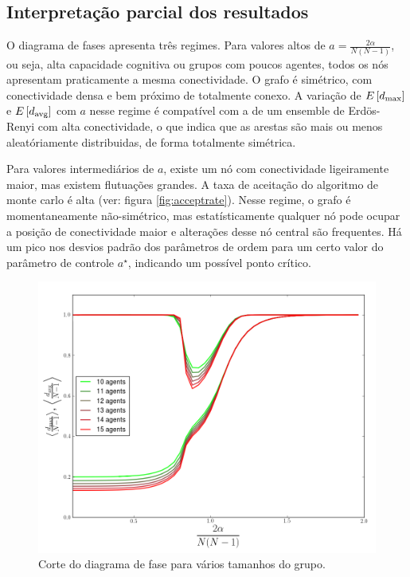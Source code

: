 \subsection{Interpretação parcial dos resultados}

O diagrama de fases apresenta três regimes. Para valores altos de $a = \frac{2\alpha}{N(N-1)}$, ou seja, alta capacidade cognitiva ou grupos com poucos agentes, todos os nós apresentam praticamente a mesma conectividade. O grafo é simétrico, com conectividade densa e bem próximo de totalmente conexo. A variação de $E\left[d_{\text{max}}\right]$ e $E\left[d_{\text{avg}}\right]$ com $a$ nesse regime é compatível com a de um ensemble de Erdös-Renyi com alta conectividade, o que indica que as arestas são mais ou menos aleatóriamente distribuidas, de forma totalmente simétrica.

Para valores intermediários de $a$, existe um nó com conectividade ligeiramente maior, mas existem flutuações grandes. A taxa de aceitação do algoritmo de monte carlo é alta (ver: figura \ref{fig:acceptrate}). Nesse regime, o grafo é momentaneamente não-simétrico, mas estatísticamente qualquer nó pode ocupar a posição de conectividade maior e alterações desse nó central são frequentes. Há um pico nos desvios padrão dos parâmetros de ordem para um certo valor do parâmetro de controle $a^{\star}$, indicando um possível ponto crítico. 
\begin{figure}
  \includegraphics[width = \textwidth]{./figuras/manysizes.png}
  \caption[Corte do diagrama de fase para vários tamanhos do grupo.]{Corte do diagrama de fase para vários tamanhos do grupo.}
  \label{fig:corte}
\end{figure}
